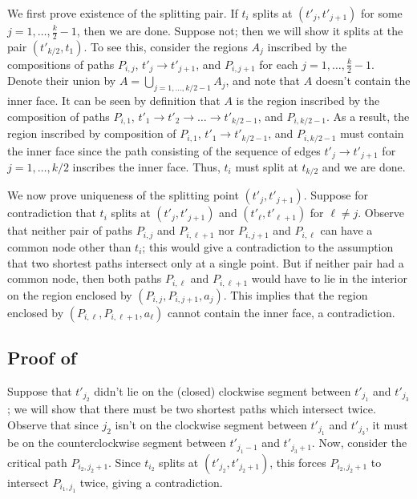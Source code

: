 \documentclass[11pt]{article}
\begin{document}
We first prove existence of the splitting pair. If $t_i$ splits at $(t'_j,t'_{j+1})$ for some $j=1,\ldots,\frac{k}{2}-1$, then we are done. Suppose not; then we will show it splits at the pair $(t'_{k/2},t_1)$. To see this, consider the regions $A_j$ inscribed by the compositions of paths $P_{i,j}$, $t'_{j}\to t'_{j+1}$, and $P_{i,j+1}$ for each $j=1,\ldots,\frac{k}{2}-1$. Denote their union by $A=\bigcup_{j=1,\ldots,k/2-1}A_j$, and note that $A$ doesn't contain the inner face. It can be seen by definition that $A$ is the region inscribed by the composition of paths $P_{i,1}$, $t'_1\to t'_2\to\ldots\to t'_{k/2-1}$, and $P_{i,k/2-1}$. As a result, the region inscribed by composition of $P_{i,1}$, $t'_1\to t'_{k/2-1}$, and $P_{i,k/2-1}$ must contain the inner face since the path consisting of the sequence of edges $t'_{j}\to t'_{j+1}$ for $j=1,\ldots,k/2$ inscribes the inner face. Thus, $t_i$ must split at $t_{k/2}$ and we are done.

We now prove uniqueness of the splitting point $(t'_j,t'_{j+1})$. Suppose for contradiction that $t_i$ splits at $(t'_j,t'_{j+1})$ and $(t'_\ell,t'_{\ell+1})$ for $\ell\neq j$. Observe that neither pair of paths $P_{i,j}$ and $P_{i,\ell+1}$ nor $P_{i,j+1}$ and $P_{i,\ell}$ can have a common node other than $t_i$; this would give a contradiction to the assumption that two shortest paths intersect only at a single point. But if neither pair had a common node, then both paths $P_{i,\ell}$ and $P_{i,\ell+1}$ would have to lie in the interior on the region enclosed by $(P_{i,j},P_{i,j+1},a_j)$. This implies that the region enclosed by $(P_{i,\ell},P_{i,\ell+1},a_\ell)$ cannot contain the inner face, a contradiction.


\subsection{Proof of }
\label{apd: Proof of obs: split move}

Suppose that $t'_{j_2}$ didn't lie on the (closed) clockwise segment between $t'_{j_1}$ and $t'_{j_3}$; we will show that there must be two shortest paths which intersect twice. Observe that since $j_2$ isn't on the clockwise segment between $t'_{j_1}$ and $t'_{j_3}$, it must be on the counterclockwise segment between $t'_{j_1-1}$ and $t'_{j_3+1}$. Now, consider the critical path $P_{i_2,j_2+1}$. Since $t_{i_2}$ splits at $(t'_{j_2},t'_{j_2+1})$, this forces $P_{i_2,j_2+1}$ to intersect $P_{i_1,j_1}$ twice, giving a contradiction.
\end{document}
